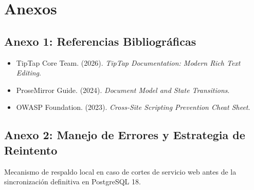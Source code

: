 \documentclass[12pt,a4paper]{article}
\begin{document}
\vspace{0.4cm}

\section{Anexos}

\subsection*{Anexo 1: Referencias Bibliográficas}
\begin{itemize}[leftmargin=1.5em, itemsep=2pt]
    \item TipTap Core Team. (2026). \textit{TipTap Documentation: Modern Rich Text Editing}.
    \item ProseMirror Guide. (2024). \textit{Document Model and State Transitions}.
    \item OWASP Foundation. (2023). \textit{Cross-Site Scripting Prevention Cheat Sheet}.
\end{itemize}

\subsection*{Anexo 2: Manejo de Errores y Estrategia de Reintento}
Mecanismo de respaldo local en caso de cortes de servicio web antes de la sincronización definitiva en PostgreSQL 18.
\end{document}
